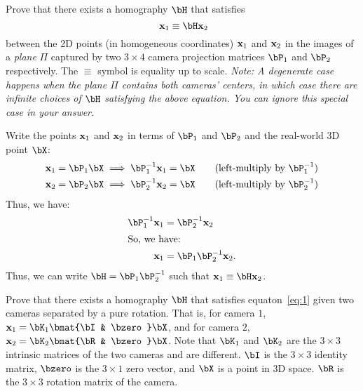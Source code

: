 \begin{problem}
  \begin{enumroman}
    \item Prove that there exists a homography $\bH$ that satisfies
      \begin{equation}~\label{eq:1}
        \bx_1 \equiv \bH \bx_2
      \end{equation}
      between the 2D points (in homogeneous coordinates) $\mathbf{x}_1$ and $\mathbf{x}_2$
      in the images of a \emph{plane} $\Pi$ captured by two $3 \times 4$ camera
      projection matrices $\bP_1$ and $\bP_2$ respectively.
      The $\equiv$ symbol is equality up to scale.
      \emph{
        Note: A degenerate case happens when the plane $\Pi$ contains both cameras'
        centers, in which case there are infinite choices of $\bH$
        satisfying the above equation.
        You can ignore this special case in your answer.
      }

      \begin{answer}
        Write the points $\mathbf{x}_1$ and $\mathbf{x}_2$ in terms of $\bP_1$ and $\bP_2$
        and the real-world 3D point $\bX$:
        \begin{align*}
          \bx_1 &= \bP_1 \bX \implies \bP_1^{-1} \bx_1 = \bX \qquad \text{(left-multiply by $\bP_1^{-1}$)} \\
          \bx_2 &= \bP_2 \bX \implies \bP_2^{-1} \bx_2 = \bX \qquad \text{(left-multiply by $\bP_2^{-1}$)}
        \end{align*}
        Thus, we have:
        \begin{align*}
          \bP_1^{-1} \bx_1 &= \bP_2^{-1} \bx_2 \\
          \intertext{So, we have: }
          \bx_1 &= \bP_1 \bP_2^{-1} \bx_2.
        \end{align*}
        Thus, we can write $\bH = \bP_1 \bP_2^{-1}$ such that $\bx_1 \equiv \bH \bx_2$.

      \end{answer}

    \item Prove that there exists a homography $\bH$ that satisfies equaton~\ref{eq:1}
      given two cameras separated by a pure rotation.
      That is, for camera $1$, $\bx_1 = \bK_1 \bmat{\bI & \bzero} \bX$,
      and for camera $2$, $\bx_2 = \bK_2 \bmat{\bR & \bzero} \bX$.
      Note that $\bK_1$ and $\bK_2$ are the $3 \times 3$ intrinsic matrices
      of the two cameras and are different. $\bI$ is the $3 \times 3$ identity matrix,
      $\bzero$ is the $3 \times 1$ zero vector, and $\bX$ is a point in 3D space.
      $\bR$ is the $3 \times 3$ rotation matrix of the camera.


\end{enumroman}
\end{problem}
